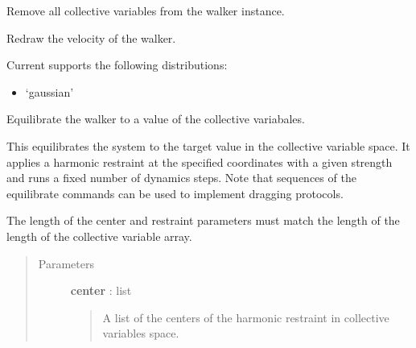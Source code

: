 \documentclass[letterpaper,10pt,english]{sphinxmanual}
\begin{document}
\begin{fulllineitems}
\begin{fulllineitems}
\label{walker_api/walker_api.doc:walker_api.lammps_walker.Lammps.destroy_colvars}
Remove all collective variables from the walker instance.

\end{fulllineitems}


\begin{fulllineitems}
\label{walker_api/walker_api.doc:walker_api.lammps_walker.Lammps.draw_velocity}
Redraw the velocity of the walker.

Current supports the following distributions:
\begin{itemize}
\item {} 
`gaussian'

\end{itemize}

\end{fulllineitems}


\begin{fulllineitems}
\label{walker_api/walker_api.doc:walker_api.lammps_walker.Lammps.equilibrate}
Equilibrate the walker to a value of the collective variabales.

This equilibrates the system to the target value in the collective variable space. It applies a harmonic restraint at the specified coordinates with a given strength and runs a fixed number of dynamics steps. Note that sequences of the equilibrate commands can be used to implement dragging protocols.

The length of the center and restraint parameters must match the length of the length of the collective variable array.
\begin{quote}\begin{description}
\item[{Parameters}] \leavevmode
\textbf{center} : list
\begin{quote}

A list of the centers of the harmonic restraint in collective variables space.
\end{quote}


\end{description}
\end{quote}
\end{fulllineitems}
\end{fulllineitems}
\end{document}
